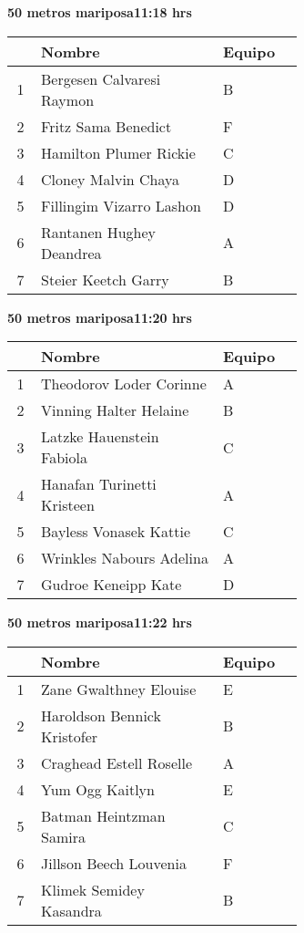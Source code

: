 \begin{minipage}{0.95\linewidth}
\begin{center}
\textbf{
50 metros mariposa\hspace{1cm}11:18 hrs}
\end{center}
\begin{tabular}{cp{0.63\linewidth}l}
\hline
& \textbf{Nombre} & \textbf{Equipo} \\ \hline
1 & Bergesen Calvaresi Raymon & B \\ 
2 & Fritz Sama Benedict & F \\ 
3 & Hamilton Plumer Rickie & C \\ 
4 & Cloney Malvin Chaya & D \\ 
5 & Fillingim Vizarro Lashon & D \\ 
6 & Rantanen Hughey Deandrea & A \\ 
7 & Steier Keetch Garry & B \\ 
\end{tabular}
\end{minipage}
\begin{minipage}{0.95\linewidth}
\begin{center}
\textbf{
50 metros mariposa\hspace{1cm}11:20 hrs}
\end{center}
\begin{tabular}{cp{0.63\linewidth}l}
\hline
& \textbf{Nombre} & \textbf{Equipo} \\ \hline
1 & Theodorov Loder Corinne & A \\ 
2 & Vinning Halter Helaine & B \\ 
3 & Latzke Hauenstein Fabiola & C \\ 
4 & Hanafan Turinetti Kristeen & A \\ 
5 & Bayless Vonasek Kattie & C \\ 
6 & Wrinkles Nabours Adelina & A \\ 
7 & Gudroe Keneipp Kate & D \\ 
\end{tabular}
\end{minipage}
\begin{minipage}{0.95\linewidth}
\begin{center}
\textbf{
50 metros mariposa\hspace{1cm}11:22 hrs}
\end{center}
\begin{tabular}{cp{0.63\linewidth}l}
\hline
& \textbf{Nombre} & \textbf{Equipo} \\ \hline
1 & Zane Gwalthney Elouise & E \\ 
2 & Haroldson Bennick Kristofer & B \\ 
3 & Craghead Estell Roselle & A \\ 
4 & Yum Ogg Kaitlyn & E \\ 
5 & Batman Heintzman Samira & C \\ 
6 & Jillson Beech Louvenia & F \\ 
7 & Klimek Semidey Kasandra & B \\ 
\end{tabular}
\end{minipage}
